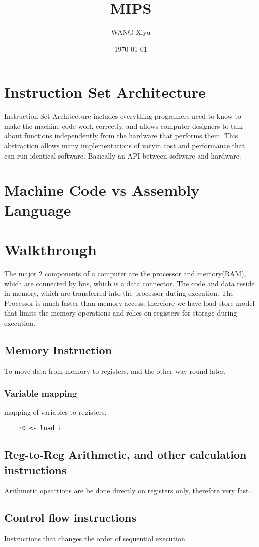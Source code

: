 \documentclass[12pt]{article}
\title{MIPS}
\author{WANG Xiyu}
\date{\today}
\theoremstyle{definition}
\begin{document}
\maketitle

\tableofcontents 

\section{Instruction Set Architecture}
Instruction Set Architecture includes everything programers need to know to make the machine code work correctly, and allows computer designers to talk about functions independently from the hardware that performs them. 
This abstraction allows many implementations of varyin cost and performance that can run identical software. Basically an API between software and hardware.
\section{Machine Code vs Assembly Language}
\section{Walkthrough}
The major 2 components of a computer are the processor and memory(RAM), which are connected by bus, which is a data connector.
The code and data reside in memory, which are transferred into the processor duting execution. 
The Processor is much faster than memory access, therefore we have load-store model that limits the memory operations and relies on registers for storage during execution.
\subsection{Memory Instruction}
To move data from memory to registers, and the other way round later.
\subsubsection*{Variable mapping}
mapping of variables to registers.
\begin{lstlisting}
    r0 <- load i
\end{lstlisting}
\subsection{Reg-to-Reg Arithmetic, and other calculation instructions}
Arithmetic opeartions are be done directly on registers only, therefore very fast.
\subsection{Control flow instructions}
Instructions that changes the order of sequential execution.
\end{document}
